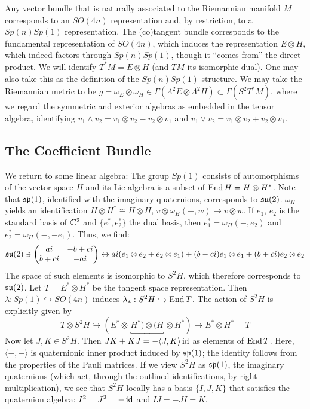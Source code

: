 \documentclass{scrartcl}
\begin{document}
\medskip

Any vector bundle that is naturally associated to the Riemannian manifold $M$ corresponds to an $SO(4n)$ representation and, by restriction, to a $Sp(n)Sp(1)$ representation. The (co)tangent bundle corresponds to the fundamental representation of $SO(4n)$, which induces the representation $E\otimes H$, which indeed factors through $Sp(n)Sp(1)$, though it ``comes from'' the direct product. We will identify $T^*M=E\otimes H$ (and $TM$ its isomorphic dual). One may also take this as the definition of the $Sp(n)Sp(1)$ structure. We may take the Riemannian metric to be $g=\omega_E\otimes \omega_H\in \Gamma(\Lambda^2 E\otimes \Lambda^2H)\subset \Gamma(S^2T^*M)$, where we regard the symmetric and exterior algebras as embedded in the tensor algebra, identifying $v_1\wedge v_2=v_1\otimes v_2-v_2\otimes v_1$ and $v_1\vee v_2=v_1\otimes v_2+v_2\otimes v_1$.

\subsection{The Coefficient Bundle}

We return to some linear algebra: The group $Sp(1)$ consists of automorphisms of the vector space $H$ and its Lie algebra is a subset of $\operatorname{End} H=H\otimes H^*$. Note that $\mathfrak{sp}(1)$, identified with the imaginary quaternions, corresponds to $\mathfrak{su}(2)$. $\omega_H$ yields an identification $H\otimes H^*\cong H\otimes H$, $v\otimes \omega_H(-,w)\mapsto v\otimes w$. If $e_1$, $e_2$ is the standard basis of $\mathbb{C}^2$ and $\{e_1^*,e_2^*\}$ the dual basis, then $e_1^*=\omega_H(-,e_2)$ and $e_2^*=\omega_H(-,-e_1)$. Thus, we find:
\begin{equation*}
	\mathfrak{su}(2)\ni
	\begin{pmatrix}
		ai & -b+ci \\
		b+ci & -ai
	\end{pmatrix}
	\leftrightarrow ai(e_1\otimes e_2+e_2\otimes e_1)+(b-ci) e_1\otimes e_1 +(b+ci) e_2\otimes e_2 
\end{equation*}
The space of such elements is isomorphic to $S^2H$, which therefore corresponds to $\mathfrak{su}(2)$.
Let $T=E^*\otimes H^*$ be the tangent space representation. Then $\lambda:Sp(1)\hookrightarrow SO(4n)$ induces $\lambda_*:S^2H\hookrightarrow \operatorname{End} T$. The action of $S^2H$ is explicitly given by
\begin{equation*}
	T\otimes S^2H\hookrightarrow 
	(E^*\otimes\, \underbracket{\!\! H^*)\otimes (H\!\!}\,\otimes H^*) 
	\to E^*\otimes H^*=T
\end{equation*}
Now let $J,K\in S^2H$. Then $JK+KJ=-\langle J,K\rangle \operatorname{id}$ as elements of $\operatorname{End} T$. Here, $\langle-,-\rangle$ is quaternionic inner product induced by $\mathfrak{sp}(1)$; the identity follows from the properties of the Pauli matrices. If we view $S^2H$ as $\mathfrak{sp}(1)$, the imaginary quaternions (which act, through the outlined identifications, by right-multiplication), we see that $S^2H$ locally has a basis $\{I,J,K\}$ that satisfies the quaternion algebra: $I^2=J^2=-\operatorname{id}$ and $IJ=-JI=K$.
\end{document}
